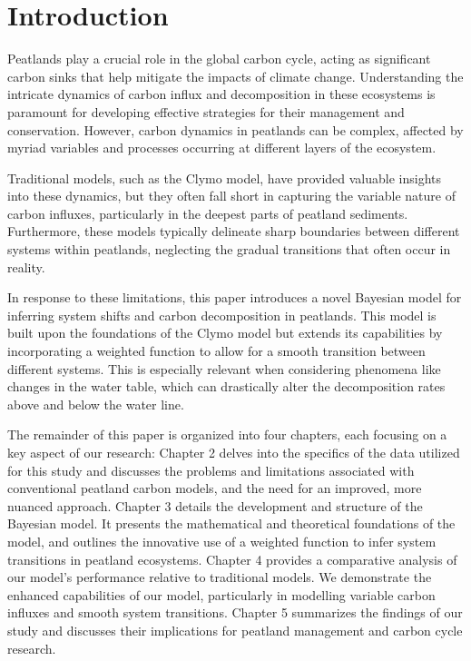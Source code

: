 \documentclass [10pt] {article}
\begin{document}
\section{Introduction}
Peatlands play a crucial role in the global carbon cycle, acting as significant carbon sinks that help mitigate the impacts of climate change. Understanding the intricate dynamics of carbon influx and decomposition in these ecosystems is paramount for developing effective strategies for their management and conservation. However, carbon dynamics in peatlands can be complex, affected by myriad variables and processes occurring at different layers of the ecosystem.

Traditional models, such as the Clymo model, have provided valuable insights into these dynamics, but they often fall short in capturing the variable nature of carbon influxes, particularly in the deepest parts of peatland sediments. Furthermore, these models typically delineate sharp boundaries between different systems within peatlands, neglecting the gradual transitions that often occur in reality.

In response to these limitations, this paper introduces a novel Bayesian model for inferring system shifts and carbon decomposition in peatlands. This model is built upon the foundations of the Clymo model but extends its capabilities by incorporating a weighted function to allow for a smooth transition between different systems. This is especially relevant when considering phenomena like changes in the water table, which can drastically alter the decomposition rates above and below the water line.

The remainder of this paper is organized into four chapters, each focusing on a key aspect of our research: Chapter 2 delves into the specifics of the data utilized for this study and discusses the problems and limitations associated with conventional peatland carbon models, and the need for an improved, more nuanced approach. Chapter 3 details the development and structure of the Bayesian model. It presents the mathematical and theoretical foundations of the model, and outlines the innovative use of a weighted function to infer system transitions in peatland ecosystems. Chapter 4 provides a comparative analysis of our model's performance relative to traditional models. We demonstrate the enhanced capabilities of our model, particularly in modelling variable carbon influxes and smooth system transitions. Chapter 5 summarizes the findings of our study and discusses their implications for peatland management and carbon cycle research. 
\end{document}
